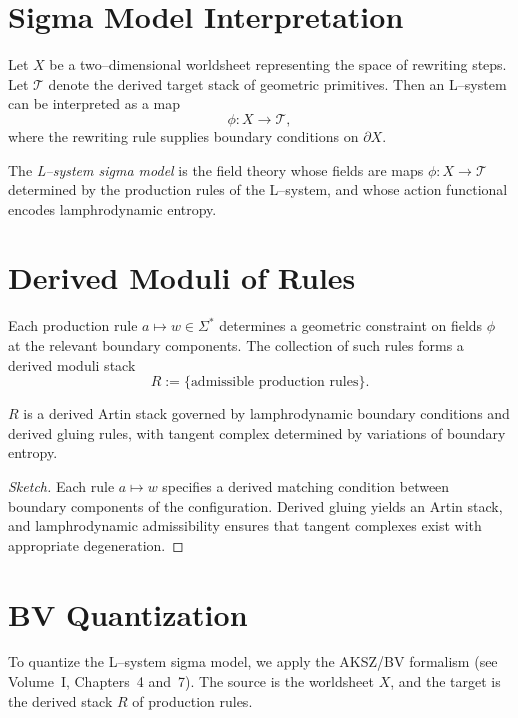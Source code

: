 \section{Sigma Model Interpretation}

Let $X$ be a two--dimensional worldsheet representing the space of
rewriting steps. Let $\mathcal{T}$ denote the derived target stack of
geometric primitives. Then an L--system can be interpreted as a map
\[
  \phi \colon X \longrightarrow \mathcal{T},
\]
where the rewriting rule supplies boundary conditions on $\partial X$.

\begin{definition}
The \emph{L--system sigma model} is the field theory whose fields are
maps $\phi\colon X\to\mathcal{T}$ determined by the production rules of
the L--system, and whose action functional encodes lamphrodynamic
entropy.
\end{definition}

\section{Derived Moduli of Rules}

Each production rule $a\mapsto w\in\Sigma^\ast$ determines a geometric
constraint on fields $\phi$ at the relevant boundary components. The
collection of such rules forms a derived moduli stack
\[
  R := \{\text{admissible production rules}\}.
\]

\begin{lemma}
$R$ is a derived Artin stack governed by lamphrodynamic boundary
conditions and derived gluing rules, with tangent complex determined by
variations of boundary entropy.
\end{lemma}

\begin{proof}[Sketch]
Each rule $a\mapsto w$ specifies a derived matching condition between
boundary components of the configuration. Derived gluing yields an Artin
stack, and lamphrodynamic admissibility ensures that tangent complexes
exist with appropriate degeneration.
\end{proof}

\section{BV Quantization}

To quantize the L--system sigma model, we apply the AKSZ/BV formalism
(see Volume~I, Chapters~4 and~7). The source is the worldsheet $X$, and
the target is the derived stack $R$ of production rules.

